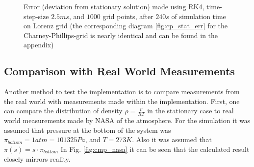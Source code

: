 \begin{figure}[!h]
    \caption{Error (deviation from stationary solution) made using RK4, time-step-size $2.5ms$, and $1000$ grid points, after $240s$ of simulation time on Lorenz grid (the corresponding diagram \ref{fig:cp_stat_err} for the Charney-Phillips-grid is nearly identical and can be found in the appendix)}
    \label{fig:lorenz_stat_err}
\end{figure}

\subsection{Comparison with Real World Measurements}
Another method to test the implementation is to compare measurements from the real world with measurements made within the implementation.
First, one can compare the distribution of density $\rho=\frac{p}{RT}$ in the stationary case to real world measurements made by NASA \cite{larson1963stratosphere} of the atmosphere.
For the simulation it was assumed that pressure at the bottom of the system was $\pi_{bottom}=1atm=101325 Pa$, and $T=273K$.
Also it was assumed that $\pi (s) = s\cdot\pi_{bottom}$
In Fig. \ref{fig:cmp_nasa} it can be seen that the calculated result closely mirrors reality.


